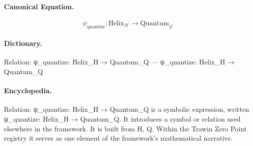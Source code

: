 \paragraph{Canonical Equation.}
\[
\psi_{\text{quantize}}: \text{Helix}_{\mathcal{H}} \to \text{Quantum}_{\mathcal{Q}}
\]

\paragraph{Dictionary.}
Relation: ψ\_quantize: Helix\_H → Quantum\_Q — ψ\_quantize: Helix\_H → Quantum\_Q

\paragraph{Encyclopedia.}
Relation: ψ\_quantize: Helix\_H → Quantum\_Q is a symbolic expression, written ψ\_quantize: Helix\_H → Quantum\_Q. It introduces a symbol or relation used elsewhere in the framework. It is built from H, Q. Within the Trawin Zero Point registry it serves as one element of the framework's mathematical narrative.
